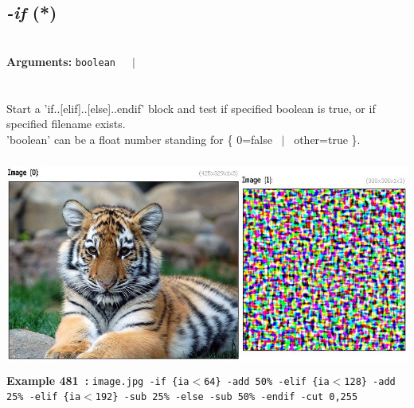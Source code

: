\documentclass[a4paper,11pt,twoside]{book}
\begin{document}
\subsection{\emph{-if} (*)}\vspace*{-0.5em}
~\\\textbf{Arguments: } 
{\small \texttt{boolean}}~~~$|$\\
\\~\\
Start a 'if..[elif]..[else]..endif' block and test if specified boolean is true,
or if specified filename exists.
~\\'boolean' can be a float number standing for \{ 0=false ~$|$~ other=true \}.
\begin{center}\includegraphics[keepaspectratio=true,height=7cm,width=\textwidth]{img/gmic_def481.jpg}\\
{\footnotesize \textbf{Example 481~:} \texttt{image.jpg -if \{ia$<$64\} -add 50\% -elif \{ia$<$128\} -add 25\% -elif \{ia$<$192\} -sub 25\% -else -sub 50\% -endif -cut 0,255}}
\end{center}
\end{document}

